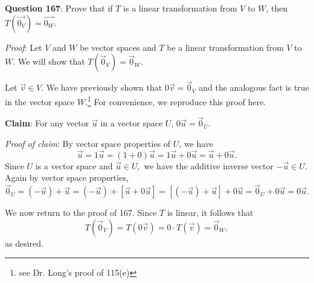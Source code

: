 \documentclass{exam}
\begin{document}
\textbf{Question 167}: Prove that if $T$ is a linear transformation from $V$ to $W$, then $T(\Vec{0_V})=\Vec{0_W}$.\newline
\vspace{0.2in}
\newline

\textit{Proof}: Let $V$ and $W$ be vector spaces and $T$ be a linear transformation from $V$ to $W$. We will show that $T(\Vec{0}_V)=\Vec{0}_W$. 

Let $\Vec{v}\in V$. We have previously shown that $0\Vec{v}=\Vec{0}_V$ and the analogous fact is true in the vector space $W$.\footnote{see Dr. Long's proof of 115(e)} For convenience, we reproduce this proof here. \newline
\vspace{0.1in}
\newline

\textbf{Claim}: For any vector $\Vec{u}$ in a vector space $U$, $0\Vec{u}=\Vec{0}_U$.\newline
\vspace{0.1in}
\newline

\textit{Proof of claim}: By vector space properties of $U$, we have $$\Vec{u}=1\Vec{u}=(1+0)\Vec{u}=1\Vec{u}+0\Vec{u}=\Vec{u}+0\Vec{u}.$$     Since $U$ is a vector space and $\Vec{u}\in U,$ we have the additive inverse vector $-\Vec{u}\in U$. Again by vector space properties, $$\Vec{0}_U=(-\Vec{u})+\Vec{u}=(-\Vec{u})+[\Vec{u}+0\Vec{u}]=[(-\Vec{u})+\Vec{u}]+0\Vec{u}=\Vec{0}_U+0\Vec{u}=0\Vec{u}.$$
\vspace{0.1in}
\newline

We now return to the proof of 167. Since $T$ is linear, it follows that $$T(\Vec{0}_V)=T(0\Vec{v})=0\cdot T(\Vec{v})=\Vec{0}_W,$$ as desired.
\end{document}
